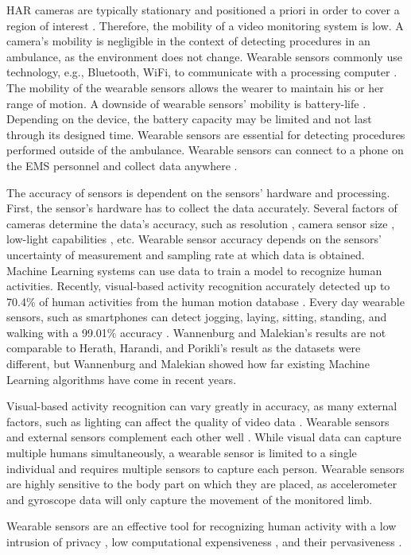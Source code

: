 \par HAR cameras are typically stationary and positioned a priori in order to cover a region of interest \cite{Poppe2010}. Therefore, the mobility of a video monitoring system is low. A camera's mobility is negligible in the context of detecting procedures in an ambulance, as the environment does not change. Wearable sensors commonly use technology, e.g., Bluetooth, WiFi, to communicate with a processing computer \cite{Lara2013}. The mobility of the wearable sensors allows the wearer to maintain his or her range of motion. A downside of wearable sensors' mobility is battery-life \cite{Lara2013}. Depending on the device, the battery capacity may be limited and not last through its designed time. Wearable sensors are essential for detecting procedures performed outside of the ambulance. Wearable sensors can connect to a phone on the EMS personnel and collect data anywhere \cite{Lara2013}.
\par The accuracy of sensors is dependent on the sensors' hardware and processing. First, the sensor's hardware has to collect the data accurately. Several factors of cameras determine the data's accuracy, such as resolution \cite{doermann2003progress}, camera sensor size \cite{6712704}, low-light capabilities \cite{1315150}, etc. Wearable sensor accuracy depends on the sensors' uncertainty of measurement and sampling rate at which data is obtained. Machine Learning systems can use data to train a model to recognize human activities. Recently, visual-based activity recognition accurately detected up to 70.4\% \cite{Herath2017} of human activities from the human motion database \cite{Kuehne11}. Every day wearable sensors, such as smartphones can detect jogging, laying, sitting, standing, and walking with a 99.01\% accuracy \cite{Wannenburg2016}. Wannenburg and Malekian's \cite{Wannenburg2016} results are not comparable to Herath, Harandi, and Porikli's \cite{Herath2017} result as the datasets were different, but Wannenburg and Malekian showed how far existing Machine Learning algorithms have come in recent years.
\par Visual-based activity recognition can vary greatly in accuracy, as many external factors, such as lighting can affect the quality of video data \cite{1315150}. Wearable sensors and external sensors complement each other well \cite{5482111}. While visual data can capture multiple humans simultaneously, a wearable sensor is limited to a single individual and requires multiple sensors to capture each person. Wearable sensors are highly sensitive to the body part on which they are placed, as accelerometer and gyroscope data will only capture the movement of the monitored limb.
\par Wearable sensors are an effective tool for recognizing human activity with a low intrusion of privacy \cite{Lara2013}, low computational expensiveness \cite{Lara2013}, and their pervasiveness \cite{Lara2013}.

